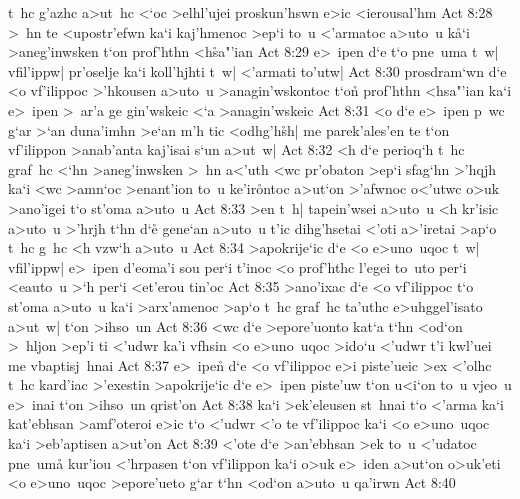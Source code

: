 t~hc
g'azhc
a>ut~hc
<`oc
>elhl'ujei
proskun'hswn
e>ic
<ierousal'hm\bibvsend
\vs Act 8:28
>~hn
te
<upostr'efwn
ka`i
kaj'hmenoc
>ep`i
to~u
<'armatoc
a>uto~u
k\r{a}`i
>aneg'inwsken
t`on
prof'hthn
<h\r{s}a"'ian\bibvsend
{}
\vs Act 8:29
e>~ipen
d`e
t`o
pne~uma
t~w|
vfil'ippw|
pr'oselje
ka`i
koll'hjhti
t~w|
<'armati
to'utw|\bibvsend
\vs Act 8:30
prosdram`wn
d`e
<o
vf'ilippoc
>'hkousen
a>uto~u
>anagin'wskontoc
t`on\r{}
prof'hthn
<hsa"'ian
ka`i
e>~ipen
>~ar'a
ge
gin'wskeic
<`a
>anagin'wskeic\bibvsend
\vs Act 8:31
<o
d`e
e>~ipen
p~wc
g`ar
>`an
duna'imhn
>e`an
m'h
tic
<odhg'h\r{s}h|
me
parek'ales'en
te
t`on
vf'ilippon
>anab'anta
kaj'isai
s`un
a>ut~w|\bibvsend
\vs Act 8:32
<h
d`e
perioq`h
t~hc
graf~hc
<`hn
>aneg'inwsken
>~hn
a<'uth
<wc
pr'obaton
>ep`i
sfag`hn
>'hqjh
ka`i
<wc
>amn`oc
>enant'ion
to~u
ke'ir\r{o}ntoc
a>ut`on
>'afwnoc
o<'utwc
o>uk
>ano'igei
t`o
st'oma
a>uto~u\bibvsend
\vs Act 8:33
>en
t~h|
tapein'wsei
a>uto~u
<h
kr'isic
a>uto~u
>'hrjh
t`hn
d`e\r{}
gene`an
a>uto~u
t'ic
dihg'hsetai
<'oti
a>'iretai
>ap`o
t~hc
g~hc
<h
vzw`h
a>uto~u\bibvsend
\vs Act 8:34
>apokrije`ic
d`e
<o
e>uno~uqoc
t~w|
vfil'ippw|
e>~ipen
d'eoma'i
sou
per`i
t'inoc
<o
prof'hthc
l'egei
to~uto
per`i
<eauto~u
>`h
per`i
<et'erou
tin'oc\bibvsend
\vs Act 8:35
>ano'ixac
d`e
<o
vf'ilippoc
t`o
st'oma
a>uto~u
ka`i
>arx'amenoc
>ap`o
t~hc
graf~hc
ta'uthc
e>uhggel'isato
a>ut~w|
t`on
>ihso~un\bibvsend
\vs Act 8:36
<wc
d`e
>epore'uonto
kat`a
t`hn
<od`on
>~hljon
>ep'i
ti
<'udwr
ka'i
vfhsin
<o
e>uno~uqoc
>ido`u
<'udwr
t'i
kwl'uei
me
vbaptisj~hnai\bibvsend
\vs Act 8:37
e>~ipen\r{}
d`e
<o
vf'ilippoc
e>i
piste'ueic
>ex
<'olhc
t~hc
kard'iac
>'exestin
>apokrije`ic
d`e
e>~ipen
piste'uw
t`on
u<i`on
to~u
vjeo~u
e>~inai
t`on
>ihso~un
qrist'on\bibvsend
\vs Act 8:38
ka`i
>ek'eleusen
st~hnai
t`o
<'arma
ka`i
kat'ebhsan
>amf'oteroi
e>ic
t`o
<'udwr
<'o
te
vf'ilippoc
ka`i
<o
e>uno~uqoc
ka`i
>eb'aptisen
a>ut'on\bibvsend
\vs Act 8:39
<'ote
d`e
>an'ebhsan
>ek
to~u
<'udatoc
pne~um\r{a}
kur'iou
<'hrpasen
t`on
vf'ilippon
ka`i
o>uk
e>~iden
a>ut`on
o>uk'eti
<o
e>uno~uqoc
>epore'ueto
g`ar
t`hn
<od`on
a>uto~u
qa'irwn\bibvsend
\vs Act 8:40
